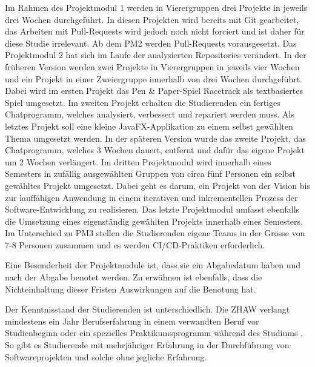 Im Rahmen des Projektmodul 1 werden in Vierergruppen drei Projekte in jeweils drei Wochen durchgeführt. In diesen Projekten wird bereits mit Git gearbeitet, das Arbeiten mit Pull-Requests wird jedoch noch nicht forciert und ist daher für diese Studie irrelevant. Ab dem PM2 werden Pull-Requests vorausgesetzt. Das Projektmodul 2 hat sich im Laufe der analysierten Repositories verändert. In der früheren Version werden zwei Projekte in Vierergruppen in jeweils vier Wochen und ein Projekt in einer Zweiergruppe innerhalb von drei Wochen durchgeführt. Dabei wird im ersten Projekt das Pen \& Paper-Spiel Racetrack als textbasiertes Spiel umgesetzt. Im zweiten Projekt erhalten die Studierenden ein fertiges Chatprogramm, welches analysiert, verbessert und repariert werden muss. Als letztes Projekt soll eine kleine JavaFX-Applikation zu einem selbst gewählten Thema umgesetzt werden. In der späteren Version wurde das zweite Projekt, das Chatprogramm, welches 3 Wochen dauert, entfernt und dafür das eigene Projekt um 2 Wochen verlängert. Im dritten Projektmodul wird innerhalb eines Semesters in zufällig ausgewählten Gruppen von circa fünf Personen ein selbst gewähltes Projekt umgesetzt. Dabei geht es darum, ein Projekt von der Vision bis zur lauffähigen Anwendung in einem iterativen und inkrementellen Prozess der Software-Entwicklung zu realisieren. Das letzte Projektmodul umfasst ebenfalls die Umsetzung eines eigenständig gewählten Projekts innerhalb eines Semesters. Im Unterschied zu PM3 stellen die Studierenden eigene Teams in der Grösse von 7-8 Personen zusammen und es werden CI/CD-Praktiken erforderlich.

Eine Besonderheit der Projektmodule ist, dass sie ein Abgabedatum haben und nach der Abgabe benotet werden. Zu erwähnen ist ebenfalls, dass die Nichteinhaltung dieser Fristen Auswirkungen auf die Benotung hat.

Der Kenntnisstand der Studierenden ist unterschiedlich. Die ZHAW verlangt mindestens ein Jahr Berufserfahrung in einem verwandten Beruf vor Studienbeginn oder ein spezielles Praktikumsprogramm während des Studiums \parencite{noauthor_aufnahmebedingungen_nodate}. So gibt es Studierende mit mehrjähriger Erfahrung in der Durchführung von Softwareprojekten und solche ohne jegliche Erfahrung. 

